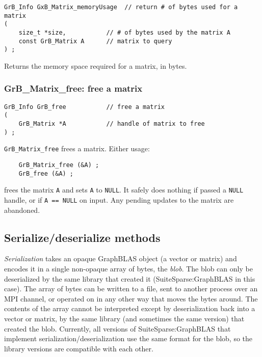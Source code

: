\documentclass[12pt]{article}
\begin{document}
{\begin{mdframed}[userdefinedwidth=6in]
{\footnotesize
\begin{verbatim}
GrB_Info GxB_Matrix_memoryUsage  // return # of bytes used for a matrix
(
    size_t *size,           // # of bytes used by the matrix A
    const GrB_Matrix A      // matrix to query
) ;
\end{verbatim} } \end{mdframed}

Returns the memory space required for a matrix, in bytes.

\subsubsection{{\sf GrB\_Matrix\_free:} free a matrix}
\label{matrix_free}

\begin{mdframed}[userdefinedwidth=6in]
{\footnotesize
\begin{verbatim}
GrB_Info GrB_free           // free a matrix
(
    GrB_Matrix *A           // handle of matrix to free
) ;
\end{verbatim} } \end{mdframed}

\verb'GrB_Matrix_free' frees a matrix.  Either usage:

    {\small
    \begin{verbatim}
    GrB_Matrix_free (&A) ;
    GrB_free (&A) ; \end{verbatim}}

\noindent
frees the matrix \verb'A' and sets \verb'A' to \verb'NULL'.  It safely does
nothing if passed a \verb'NULL' handle, or if \verb'A == NULL' on input.  Any
pending updates to the matrix are abandoned.

\newpage
\subsection{Serialize/deserialize methods}
\label{serialize_deserialize}

{\em Serialization} takes an opaque GraphBLAS object (a vector or matrix) and
encodes it in a single non-opaque array of bytes, the {\em blob}.  The blob can
only be deserialized by the same library that created it (SuiteSparse:GraphBLAS
in this case).  The array of bytes can be written to a file, sent to another
process over an MPI channel, or operated on in any other way that moves the
bytes around.  The contents of the array cannot be interpreted except by
deserialization back into a vector or matrix, by the same library (and
sometimes the same version) that created the blob.  Currently, all versions of
SuiteSparse:GraphBLAS that implement serialization/deserialization use the same
format for the blob, so the library versions are compatible with each other.

}
\end{document}
